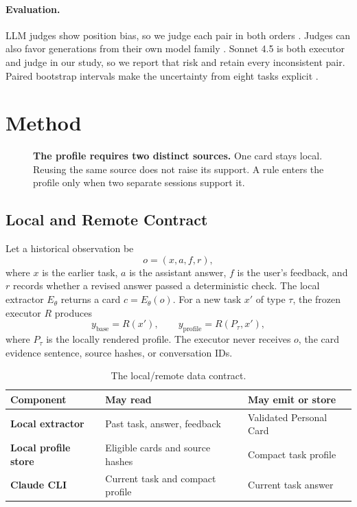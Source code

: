 \documentclass{article}
\begin{document}
\paragraph{Evaluation.}
LLM judges show position bias, so we judge each pair in both orders
\citep{zheng2023judginglw}. Judges can also favor generations from their own
model family \citep{panickssery2024llmer}. Sonnet 4.5 is both executor and
judge in our study, so we report that risk and retain every inconsistent pair.
Paired bootstrap intervals make the uncertainty from eight tasks explicit
\citep{efron1979bootstrapma}.

\section{Method}
\label{sec:method}

\begin{figure}[t]
\centering
\resizebox{\linewidth}{!}{}
\caption{\textbf{The profile requires two distinct sources.} One card stays
local. Reusing the same source does not raise its support. A rule enters the
profile only when two separate sessions support it.}
\label{fig:card-lifecycle}
\end{figure}

\subsection{Local and Remote Contract}

Let a historical observation be
\[
o=(x,a,f,r),
\]
where $x$ is the earlier task, $a$ is the assistant answer, $f$ is the user's
feedback, and $r$ records whether a revised answer passed a deterministic
check. The local extractor $E_\theta$ returns a card $c=E_\theta(o)$. For a new
task $x'$ of type $\tau$, the frozen executor $R$ produces
\[
y_{\mathrm{base}}=R(x'), \qquad
y_{\mathrm{profile}}=R(P_\tau,x'),
\]
where $P_\tau$ is the locally rendered profile. The executor never receives
$o$, the card evidence sentence, source hashes, or conversation IDs.

\begin{table}[t]
\centering
\small
\caption{The local/remote data contract.}
\label{tab:contract}
\begin{tabularx}{\linewidth}{>{\bfseries}p{2.5cm}YY}
\toprule
{}
Component & May read & May emit or store \\
\midrule
Local extractor & Past task, answer, feedback & Validated Personal Card \\
Local profile store & Eligible cards and source hashes & Compact task profile \\
Claude CLI & Current task and compact profile & Current task answer \\
\bottomrule
\end{tabularx}
\end{table}
\end{document}

